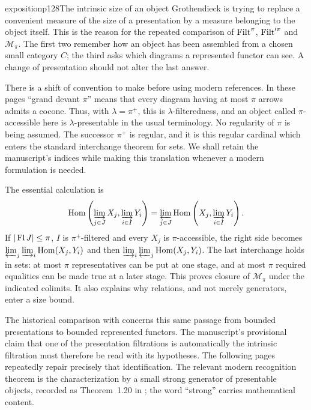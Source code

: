 \begin{dcomment}{exposition}{p128}{The intrinsic size of an object}
Grothendieck is trying to replace a convenient measure of the size of a presentation by a measure belonging to the object itself. This is the reason for the repeated comparison of $\operatorname{Filt}^{\pi}$, $\operatorname{Filt}'^{\pi}$ and $\mathcal M_\pi$. The first two remember how an object has been assembled from a chosen small category $C$; the third asks which diagrams a represented functor can see. A change of presentation should not alter the last answer.

There is a shift of convention to make before using modern references. In these pages ``grand devant $\pi$'' means that every diagram having at most $\pi$ arrows admits a cocone. Thus, with $\lambda=\pi^+$, this is $\lambda$-filteredness, and an object called $\pi$-accessible here is $\lambda$-presentable in the usual terminology. No regularity of $\pi$ is being assumed. The successor $\pi^+$ is regular, and it is this regular cardinal which enters the standard interchange theorem for sets. We shall retain the manuscript's indices while making this translation whenever a modern formulation is needed.

The essential calculation is
\[
 \operatorname{Hom}\left(\varinjlim_{j\in J}X_j,\varinjlim_{i\in I}Y_i\right)
 =\varprojlim_{j\in J}\operatorname{Hom}\left(X_j,\varinjlim_{i\in I}Y_i\right).
\]
If $|\operatorname{Fl} J|\leq\pi$, $I$ is $\pi^+$-filtered and every $X_j$ is $\pi$-accessible, the right side becomes
$\varprojlim_j\varinjlim_i\operatorname{Hom}(X_j,Y_i)$ and then
$\varinjlim_i\varprojlim_j\operatorname{Hom}(X_j,Y_i)$. The last interchange holds in sets: at most $\pi$ representatives can be put at one stage, and at most $\pi$ required equalities can be made true at a later stage. This proves closure of $\mathcal M_\pi$ under the indicated colimits. It also explains why relations, and not merely generators, enter a size bound.

The historical comparison with \citet[Expos\'e~I, \S9]{SGA4I1972} concerns this same passage from bounded presentations to bounded represented functors. The manuscript's provisional claim that one of the presentation filtrations is automatically the intrinsic filtration must therefore be read with its hypotheses. The following pages repeatedly repair precisely that identification. The relevant modern recognition theorem is the characterization by a small strong generator of presentable objects, recorded as Theorem~1.20 in \citet{AdamekRosicky1994}; the word ``strong'' carries mathematical content.
\end{dcomment}


